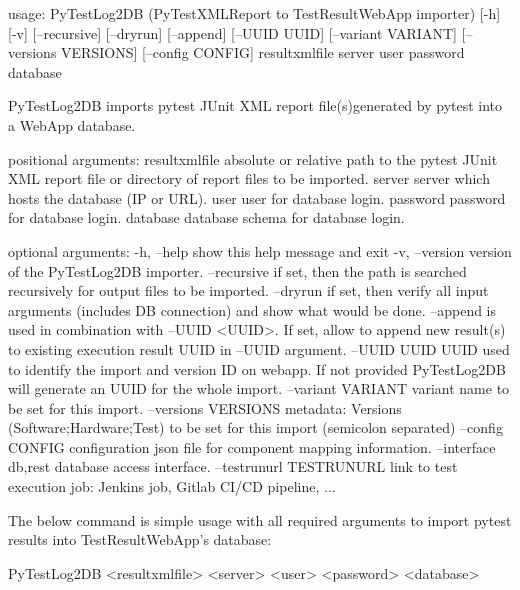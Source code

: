 \begin{robotlog}
usage: PyTestLog2DB (PyTestXMLReport to TestResultWebApp importer) [-h] [-v]
                    [--recursive] [--dryrun] [--append] [--UUID UUID]
                    [--variant VARIANT] [--versions VERSIONS] [--config CONFIG]
                    resultxmlfile server user password database

PyTestLog2DB imports pytest JUnit XML report file(s)generated by pytest into a WebApp database.

positional arguments:
resultxmlfile        absolute or relative path to the pytest JUnit XML report
                     file or directory of report files to be imported.
server               server which hosts the database (IP or URL).
user                 user for database login.
password             password for database login.
database             database schema for database login.

optional arguments:
-h, --help           show this help message and exit
-v, --version        version of the PyTestLog2DB importer.
--recursive          if set, then the path is searched recursively for output
                     files to be imported.
--dryrun             if set, then verify all input arguments (includes DB connection)
                     and show what would be done.
--append             is used in combination with --UUID <UUID>. If set, allow to append
                     new result(s) to existing execution result UUID in --UUID argument.
--UUID UUID          UUID used to identify the import and version ID on webapp.
                     If not provided PyTestLog2DB will generate an UUID for the whole import.
--variant VARIANT    variant name to be set for this import.
--versions VERSIONS  metadata: Versions (Software;Hardware;Test) to be set for this import
                     (semicolon separated)
--config CONFIG      configuration json file for component mapping information.
--interface {db,rest} 
                     database access interface.
--testrunurl TESTRUNURL
                     link to test execution job: Jenkins job, Gitlab CI/CD pipeline, ...
\end{robotlog}

    The below command is simple usage with all required arguments to import
    pytest results into TestResultWebApp's database:

\begin{robotlog}
PyTestLog2DB <resultxmlfile> <server> <user> <password> <database>
\end{robotlog}


